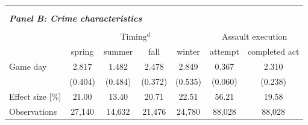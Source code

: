 \begin{table}[ht]
\begin{threeparttable}
{\begin{tabular}{l*{6}{c}}
				\\\\\\
				\multicolumn{6}{l}{\textit{\textbf{Panel B: Crime characteristics}}} \\\\
				& \multicolumn{4}{c}{Timing$^d$} & \multicolumn{2}{c}{Assault execution} \\
				\cmidrule(lr){2-5} \cmidrule(lr){6-7}
				& spring & summer & fall & winter & attempt & completed act \\
				\midrule
				Game day            	 &     2.817\sym{***}&       1.482\sym{**} &       2.478\sym{***}&       2.849\sym{***}&       0.367\sym{***}&       2.310\sym{***}\\
										 &   (0.404)         &     (0.484)         &     (0.372)         &     (0.535)         &     (0.060)         &     (0.238)         \\
				Effect size [\%]&     21.00         &       13.40         &       20.71         &       22.51         &       56.21         &       19.58         \\
				Observations        	 &    27,140         &      14,632         &      21,476         &      24,780         &      88,028         &      88,028         \\
				

\end{tabular}}
\end{threeparttable}
\end{table}
